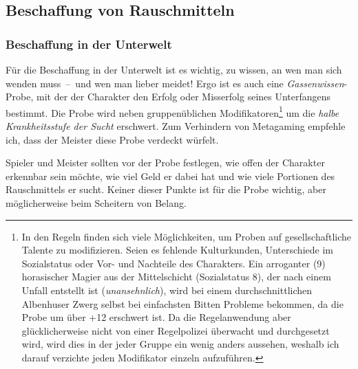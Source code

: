 \subsection{Beschaffung von Rauschmitteln}
\subsubsection{Beschaffung in der Unterwelt\label{beschaffung-unterwelt}}
Für die Beschaffung in der Unterwelt ist es wichtig, zu wissen, an wen man sich wenden muss~--~und wen man lieber meidet! Ergo ist es auch eine \emph{Gassenwissen}-Probe, mit der der Charakter den Erfolg oder Misserfolg seines Unterfangens bestimmt. Die Probe wird neben gruppenüblichen Modifikatoren\footnote{In den Regeln finden sich viele Möglichkeiten, um Proben auf gesellschaftliche Talente zu modifizieren. Seien es fehlende Kulturkunden, Unterschiede im Sozialstatus \cite[S.~276]{WdH} oder Vor- und Nachteile \cite[S.~246~ff.]{WdH} des Charakters. Ein arroganter (9) horasischer Magier aus der Mittelschicht (Sozialstatus 8), der nach einem Unfall entstellt ist (\emph{unansehnlich}), wird bei einem durchschnittlichen Albenhuser Zwerg selbst bei einfachsten Bitten Probleme bekommen, da die Probe um über +12 erschwert ist. Da die Regelanwendung aber glücklicherweise nicht von einer Regelpolizei überwacht und durchgesetzt wird, wird dies in der jeder Gruppe ein wenig anders aussehen, weshalb ich darauf verzichte jeden Modifikator einzeln aufzuführen.} um die \emph{halbe Krankheitsstufe der Sucht} erschwert. Zum Verhindern von Metagaming empfehle ich, dass der Meister diese Probe verdeckt würfelt.

Spieler und Meister sollten vor der Probe festlegen, wie offen der Charakter erkennbar sein möchte, wie viel Geld er dabei hat und wie viele Portionen des Rauschmittels er sucht. Keiner dieser Punkte ist für die Probe wichtig, aber möglicherweise beim Scheitern von Belang.

